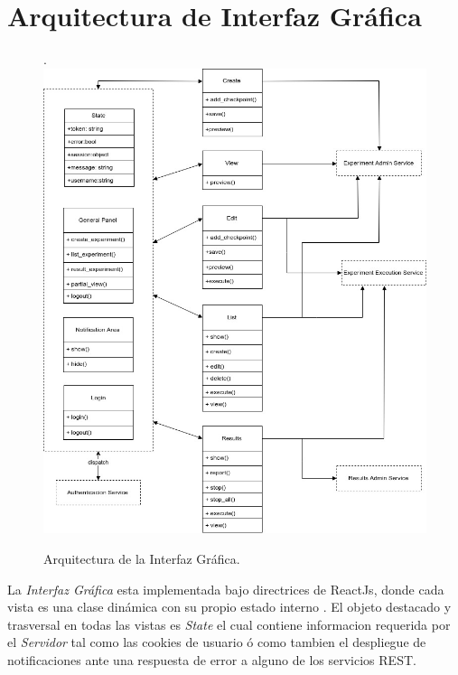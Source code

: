 \section{Arquitectura de Interfaz Gr\'afica}
\begin{figure}[!htb].
    \includegraphics[scale=0.42]{../figures/d21.jpg}
    \caption{Arquitectura de la Interfaz Gr\'afica. }
    \label{fig:d21}
\end{figure}

La \textit{Interfaz Gr\'afica} esta implementada bajo directrices de ReactJs\cite{react_thinking}, donde
cada vista es una clase din\'amica con su propio estado interno\cite{react_components} . El objeto destacado y trasversal
en todas las vistas es \textit{State}\cite{react_state} el cual contiene informacion requerida por el 
\textit{Servidor} tal como las cookies de usuario \'o como tambien el despliegue de notificaciones ante 
una respuesta de error a alguno de los servicios REST.   


\newpage